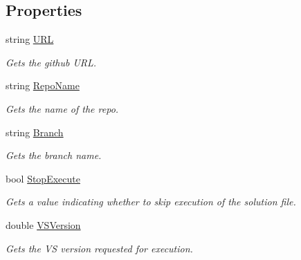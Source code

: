 \subsection*{Properties}
\begin{DoxyCompactItemize}
\item 
string \mbox{\hyperlink{class_get_repo_cmdlet_1_1_cmd_container_a57d88a0a01ee850f4a971e0063a8df8f}{U\+RL}}
\begin{DoxyCompactList}\small\item\em Gets the github U\+RL. \end{DoxyCompactList}\item 
string \mbox{\hyperlink{class_get_repo_cmdlet_1_1_cmd_container_a2c0e7dc57cca3fefcea86853024ab385}{Repo\+Name}}
\begin{DoxyCompactList}\small\item\em Gets the name of the repo. \end{DoxyCompactList}\item 
string \mbox{\hyperlink{class_get_repo_cmdlet_1_1_cmd_container_a36567fe0c3d03173a07f60ddb1524029}{Branch}}
\begin{DoxyCompactList}\small\item\em Gets the branch name. \end{DoxyCompactList}\item 
bool \mbox{\hyperlink{class_get_repo_cmdlet_1_1_cmd_container_a2400da2e8f1299ed878e7c4cabf2afb6}{Stop\+Execute}}
\begin{DoxyCompactList}\small\item\em Gets a value indicating whether to skip execution of the solution file. \end{DoxyCompactList}\item 
double \mbox{\hyperlink{class_get_repo_cmdlet_1_1_cmd_container_aa3c4d3c76b60c871e174d0e971c7b6d4}{V\+S\+Version}}
\begin{DoxyCompactList}\small\item\em Gets the VS version requested for execution. \end{DoxyCompactList}\item 

\end{DoxyCompactItemize}

